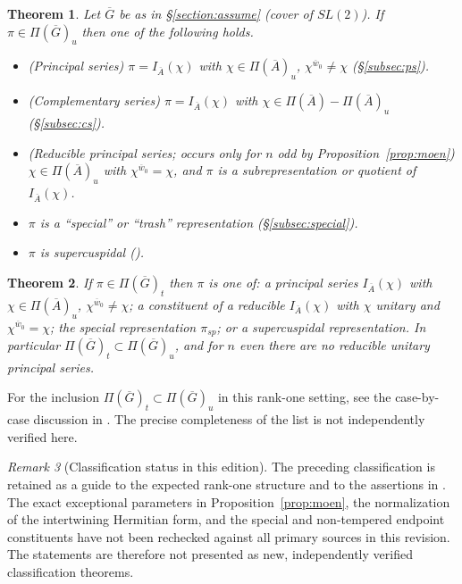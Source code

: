 \documentclass[12pt,letterpaper]{article}
\newtheorem{theorem}{Theorem}[section]
\theoremstyle{definition}
\theoremstyle{remark}
\newtheorem{remark}[theorem]{Remark}
\newcommand{\bG}{\overline{G}}
\newcommand{\bA}{\overline{A}}
\newcommand{\bw}{\overline{w}}
\begin{document}
\begin{theorem}\label{thm:class-u}
Let $\bG$ be as in \S\ref{section:assume} (cover of $SL(2)$). If $\pi\in\Pi(\bG)_u$ then one of the following
holds.
\begin{itemize}[leftmargin=*,itemsep=1pt]
\item (Principal series) $\pi=I_{\bA}(\chi)$ with $\chi\in\Pi(\bA)_u$, $\chi^{\bw_0}\ne\chi$ (\S\ref{subsec:ps}).
\item (Complementary series) $\pi=I_{\bA}(\chi)$ with $\chi\in\Pi(\bA)-\Pi(\bA)_u$ (\S\ref{subsec:cs}).
\item (Reducible principal series; occurs only for $n$ odd by Proposition~\ref{prop:moen}) $\chi\in\Pi(\bA)_u$ with
$\chi^{\bw_0}=\chi$, and $\pi$ is a subrepresentation or quotient of $I_{\bA}(\chi)$.
\item $\pi$ is a ``special'' or ``trash'' representation (\S\ref{subsec:special}).
\item $\pi$ is supercuspidal (\cite{Jo99b}).
\end{itemize}
\end{theorem}
\begin{theorem}\label{thm:class-t}
If $\pi\in\Pi(\bG)_t$ then $\pi$ is one of: a principal series $I_{\bA}(\chi)$ with $\chi\in\Pi(\bA)_u$,
$\chi^{\bw_0}\ne\chi$; a constituent of a reducible $I_{\bA}(\chi)$ with $\chi$ unitary and $\chi^{\bw_0}=\chi$;
the special representation $\pi_{sp}$; or a supercuspidal representation. In particular
$\Pi(\bG)_t\subset\Pi(\bG)_u$, and for $n$ even there are no reducible unitary principal series.
\end{theorem}
For the inclusion $\Pi(\bG)_t\subset\Pi(\bG)_u$ in this rank-one setting, see the case-by-case discussion in \cite{Jo94,Jo01}.  The precise completeness of the list is not independently verified here.

\begin{remark}[Classification status in this edition]\label{rem:classification-status}
The preceding classification is retained as a guide to the expected
rank-one structure and to the assertions in \cite{Jo94,Jo01}.  The
exact exceptional parameters in Proposition~\ref{prop:moen}, the
normalization of the intertwining Hermitian form, and the special and
non-tempered endpoint constituents have not been rechecked against
all primary sources in this revision.  The statements are therefore
not presented as new, independently verified classification theorems.
\end{remark}
\end{document}
